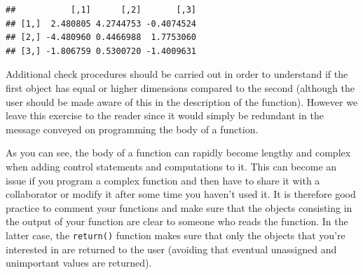 \documentclass[12pt,]{krantz}
\let\BeginKnitrBlock\begin \let\EndKnitrBlock\end
\begin{document}
\begin{verbatim}
##           [,1]      [,2]       [,3]
## [1,]  2.480805 4.2744753 -0.4074524
## [2,] -4.480960 0.4466988  1.7753060
## [3,] -1.806759 0.5300720 -1.4009631
\end{verbatim}

\BeginKnitrBlock{rmdimportant}
Additional check procedures should be carried out in order to understand
if the first object has equal or higher dimensions compared to the
second (although the user should be made aware of this in the
description of the function). However we leave this exercise to the
reader since it would simply be redundant in the message conveyed on
programming the body of a function.
\EndKnitrBlock{rmdimportant}

As you can see, the body of a function can rapidly become lengthy and
complex when adding control statements and computations to it. This can
become an issue if you program a complex function and then have to share
it with a collaborator or modify it after some time you haven't used it.
It is therefore good practice to comment your functions and make sure
that the objects consisting in the output of your function are clear to
someone who reads the function. In the latter case, the
\texttt{return()} function makes sure that only the objects that you're
interested in are returned to the user (avoiding that eventual
unassigned and unimportant values are returned).
\end{document}
